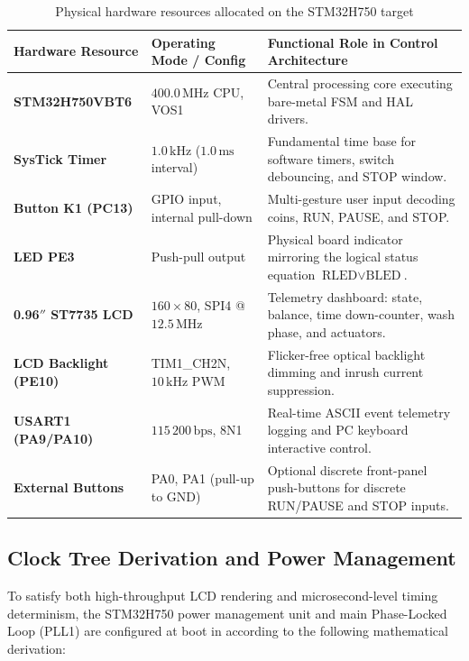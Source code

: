\begin{table}[H]
  \centering
  \caption{Physical hardware resources allocated on the STM32H750 target}
  \label{tab:board}
  \small
  \renewcommand{\arraystretch}{1.18}
  \begin{tabularx}{\linewidth}{L{3.8cm}L{3.8cm}Y}
    \toprule
    \textbf{Hardware Resource} & \textbf{Operating Mode / Config} & \textbf{Functional Role in Control Architecture} \\
    \midrule
    \textbf{STM32H750VBT6} & $400.0\,\text{MHz}$ CPU, VOS1 & Central processing core executing bare-metal FSM and HAL drivers. \\
    \textbf{SysTick Timer} & $1.0\,\text{kHz}$ ($1.0\,\text{ms}$ interval) & Fundamental time base for software timers, switch debouncing, and STOP window. \\
    \textbf{Button K1 (PC13)} & GPIO input, internal pull-down & Multi-gesture user input decoding coins, RUN, PAUSE, and STOP. \\
    \textbf{LED PE3}       & Push-pull output & Physical board indicator mirroring the logical status equation $\text{RLED} \lor \text{BLED}$. \\
    \textbf{0.96$''$ ST7735 LCD} & $160 \times 80$, SPI4 @ $12.5\,\text{MHz}$ & Telemetry dashboard: state, balance, time down-counter, wash phase, and actuators. \\
    \textbf{LCD Backlight (PE10)} & TIM1\_CH2N, $10\,\text{kHz}$ PWM & Flicker-free optical backlight dimming and inrush current suppression. \\
    \textbf{USART1 (PA9/PA10)} & $115\,200\,\text{bps}$, 8N1 & Real-time ASCII event telemetry logging and PC keyboard interactive control. \\
    \textbf{External Buttons} & PA0, PA1 (pull-up to GND) & Optional discrete front-panel push-buttons for discrete RUN/PAUSE and STOP inputs. \\
    \bottomrule
  \end{tabularx}
\end{table}

\subsection{Clock Tree Derivation and Power Management}
\label{sec:clock-tree}

To satisfy both high-throughput LCD rendering and microsecond-level timing determinism, the
STM32H750 power management unit and main Phase-Locked Loop (PLL1) are configured at boot
in  according to the following mathematical derivation:

